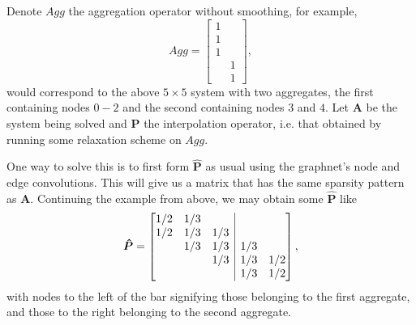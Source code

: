 \documentclass{article}
\newcommand{\mat}[1]{\bm{{#1}}}
\newcommand{\sfrac}[2]{#1/#2}
\begin{document}
Denote $Agg$ the aggregation operator without smoothing, for example,
\begin{equation}
Agg =
\begin{bmatrix}
  1 & \\
  1 & \\
  1 & \\
  & 1 \\
  & 1
\end{bmatrix},
\end{equation}
would correspond to the above $5 \times 5$ system with two aggregates, the first containing nodes $0-2$ and the second containing nodes $3$ and $4$.  Let $\mat{A}$ be the system being solved and $\mat{P}$ the interpolation operator, i.e. that obtained by running some relaxation scheme on $Agg$.

One way to solve this is to first form $\mat{\hat{P}}$ as usual using the graphnet's node and edge convolutions.  This will give us a matrix that has the same sparsity pattern as $\mat{A}$.  Continuing the example from above, we may obtain some $\mat{\hat{P}}$ like
\begin{equation}
\mat{\hat{P}} =
\left[\begin{array}{@{}ccc|cc@{}}
  \sfrac{1}{2} & \sfrac{1}{3} & & & \\
  \sfrac{1}{2} & \sfrac{1}{3} & \sfrac{1}{3} & & \\
               & \sfrac{1}{3} & \sfrac{1}{3} & \sfrac{1}{3} &\\
               &              & \sfrac{1}{3} & \sfrac{1}{3} & \sfrac{1}{2} \\
  &              &              & \sfrac{1}{3} & \sfrac{1}{2}
\end{array}\right],
\end{equation}
with nodes to the left of the bar signifying those belonging to the first aggregate, and those to the right belonging to the second aggregate.
\end{document}
